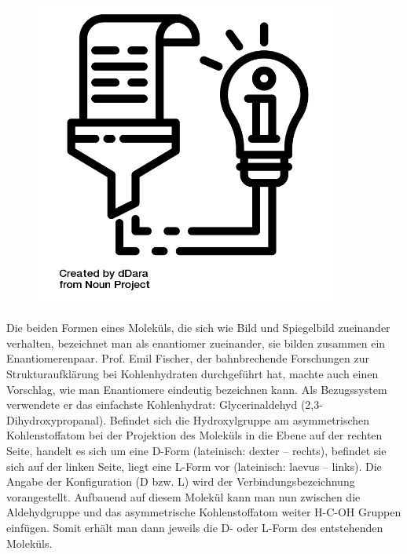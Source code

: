 \documentclass{scrartcl}  %
\begin{document}
\vspace{0.3cm}
			\begin{tcolorbox}[enhanced,
				colback=white,
				colframe=darkgray,
				fonttitle=\sffamily\bfseries\large, 
				title=Enantiomere,  %
				attach boxed title to top left={xshift=3.2mm,yshift=-0.50mm},
				boxed title style={skin=enhancedfirst jigsaw,size=small,arc=1mm,bottom=-1mm,colframe=darkgray,height=0.75cm},
				colbacktitle=darkgray,
				drop lifted shadow]
				\begin{figure}  
					\centering
					\vspace{-14pt}  %
					\includegraphics[width=0.9\textwidth]{symbols/symbol_tex_content}
				\end{figure}
				
				Die beiden Formen eines Moleküls, die sich wie Bild und Spiegelbild zueinander verhalten, bezeichnet man als enantiomer zueinander, sie bilden zusammen ein Enantiomerenpaar. Prof. Emil Fischer, der bahnbrechende Forschungen zur Strukturaufklärung bei Kohlenhydraten durchgeführt hat, machte auch einen Vorschlag, wie man Enantiomere eindeutig bezeichnen kann. \newline
				Als Bezugssystem verwendete er das einfachste Kohlenhydrat: Glycerinaldehyd (2,3-Dihydroxypropanal). Befindet sich die Hydroxylgruppe am asymmetrischen Kohlenstoffatom bei der Projektion des Moleküls in die Ebene auf der rechten Seite, handelt es sich um eine D-Form (lateinisch: dexter – rechts), befindet sie sich auf der linken Seite, liegt eine L-Form vor (lateinisch: laevus – links). Die Angabe der Konfiguration (D bzw. L) wird der Verbindungsbezeichnung vorangestellt. \newline
				Aufbauend auf diesem Molekül kann man nun zwischen die Aldehydgruppe und das asymmetrische Kohlenstoffatom weiter H-C-OH Gruppen einfügen. Somit erhält man dann jeweils die D- oder L-Form des entstehenden Moleküls.
				
			\end{tcolorbox}				
\end{document}
